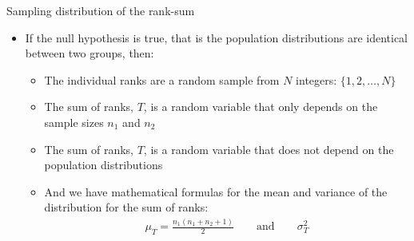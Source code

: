 \documentclass[xcolor=dvipsnames]{beamer}
\begin{document}
\begin{frame}{Sampling distribution of the rank-sum}
	\begin{itemize}
		\item If the null hypothesis is true, that is the population distributions are identical between two groups, then:
		\begin{itemize}
			\item The individual ranks are a random sample from $N$ integers: $\{1, 2, \hdots, N\}$
			\item The sum of ranks, $T$, is a random variable that only depends on the sample sizes $n_1$ and $n_2$
			\item The sum of ranks, $T$, is a random variable that does not depend on the population distributions
			\item And we have mathematical formulas for the mean and variance of the distribution for the sum of ranks:
			\begin{gather*}
			\mu_T = \frac{n_1 (n_1 + n_2 + 1)}{2} \quad \quad \text{and} \quad \quad \sigma_T^{2}
			\end{gather*}
		\end{itemize}
	\end{itemize}
\end{frame}
\end{document}
